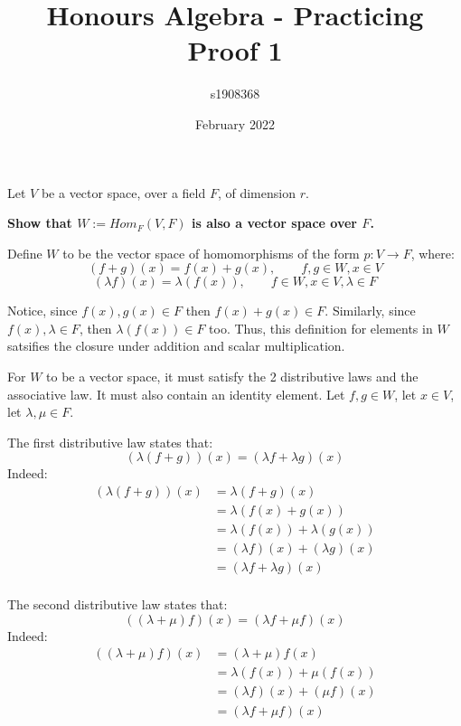 \documentclass{exam}
\title{Honours Algebra - Practicing Proof 1}
\author{s1908368}
\date{February 2022}
\begin{document}
\maketitle

Let $V$ be a vector space, over a field $F$, of dimension $r$.

\begin{questions}

\question \textbf{Show that $W := Hom_F(V,F)$ is also a vector space over $F$.}

\bigskip

Define $W$ to be the vector space of homomorphisms of the form $p : V \to F$, where:
\[
(f+g)(x) = f(x) + g(x), \qquad f,g \in W, x \in V
\]
\[
(\lambda f)(x) = \lambda (f(x)), \qquad f \in W, x \in V, \lambda \in F
\]

Notice, since $f(x), g(x) \in F$ then $f(x) + g(x) \in F$. Similarly, since $f(x), \lambda \in F$, then $\lambda(f(x)) \in F$ too. Thus, this definition for elements in $W$ satsifies the closure under addition and scalar multiplication.

\bigskip

For $W$ to be a vector space, it must satisfy the 2 distributive laws and the associative law. It must also contain an identity element.  Let $f,g \in W$, let $x \in V$, let $\lambda, \mu \in F$.

\bigskip

The first distributive law states that:
\[
(\lambda(f + g))(x) = (\lambda f + \lambda g)(x)
\]
Indeed:
\begin{align*}
    (\lambda(f + g))(x) &= \lambda (f + g)(x) \\
                        &= \lambda (f(x) + g(x)) \\
                        &= \lambda (f(x)) + \lambda(g(x)) \\
                        &= (\lambda f)(x) + (\lambda g)(x) \\
                        &= (\lambda f + \lambda g)(x) \\
\end{align*}

The second distributive law states that:
\[
((\lambda + \mu)f)(x) = (\lambda f + \mu f)(x)
\]
Indeed:
\begin{align*}
    ((\lambda + \mu)f)(x) &= (\lambda + \mu)f(x) \\
                        &= \lambda (f(x)) + \mu (f(x)) \\
                        &= (\lambda f)(x) + (\mu f)(x) \\
                        &= (\lambda f + \mu f)(x) \\
\end{align*}


\end{questions}
\end{document}

